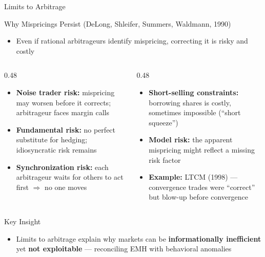 \documentclass[9pt, aspectratio=169, t]{beamer}
\theoremstyle{definition}
\newenvironment{cminipage}[1]{%
    \par\noindent\hfill\begin{minipage}{#1}\ignorespaces
}{%
    \end{minipage}\hfill\null\par
}
\begin{document}
\begin{frame}{Limits to Arbitrage}
\begin{cminipage}{0.95\textwidth}
\small
\begin{block}{Why Mispricings Persist (DeLong, Shleifer, Summers, Waldmann, 1990)}
\begin{itemize}\setlength{\itemsep}{0pt}
    \item Even if rational arbitrageurs identify mispricing, correcting it is risky and costly
\end{itemize}
\end{block}

\begin{columns}[T]
\begin{column}{0.48\textwidth}
\begin{itemize}\setlength{\itemsep}{0pt}
    \item \textbf{Noise trader risk:} mispricing may worsen before it corrects; arbitrageur faces margin calls
    \item \textbf{Fundamental risk:} no perfect substitute for hedging; idiosyncratic risk remains
    \item \textbf{Synchronization risk:} each arbitrageur waits for others to act first $\Rightarrow$ no one moves
\end{itemize}
\end{column}
\begin{column}{0.48\textwidth}
\begin{itemize}\setlength{\itemsep}{0pt}
    \item \textbf{Short-selling constraints:} borrowing shares is costly, sometimes impossible (``short squeeze'')
    \item \textbf{Model risk:} the apparent mispricing might reflect a missing risk factor
    \item \textbf{Example:} LTCM (1998) --- convergence trades were ``correct'' but blow-up before convergence
\end{itemize}
\end{column}
\end{columns}

\vspace{0.1cm}
\begin{alertblock}{Key Insight}
\begin{itemize}\setlength{\itemsep}{0pt}
    \item Limits to arbitrage explain why markets can be \textbf{informationally inefficient} yet \textbf{not exploitable} --- reconciling EMH with behavioral anomalies
\end{itemize}
\end{alertblock}
\end{cminipage}
\end{frame}
\end{document}
